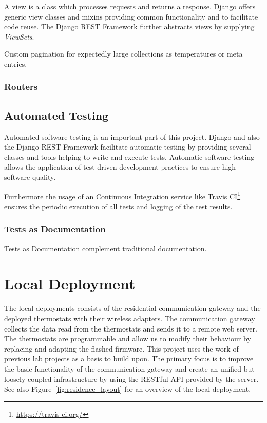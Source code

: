 A view is a class which processes requests and returns a response.
Django offers generic view classes and mixins providing common functionality and to facilitate code reuse.
The Django REST Framework further abstracts views by supplying \emph{ViewSets}.

Custom pagination for expectedly large collections as temperatures or meta entries.

\subsubsection{Routers}
\label{sec:server_infrastructure_routers}



\subsection{Automated Testing}

Automated software testing is an important part of this project. Django and also the Django REST Framework facilitate automatic testing by providing several classes and tools helping to write and execute tests. Automatic software testing allows the application of test-driven development practices to ensure high software quality.

Furthermore the usage of an Continuous Integration service like Travis CI\footnote{\url{https://travis-ci.org/}} ensures the periodic execution of all tests and logging of the test results.

\subsubsection{Tests as Documentation}

Tests as Documentation complement traditional documentation.


\section{Local Deployment}
\label{sec:local_infrastructure}

The local deployments consists of the residential communication gateway and the deployed thermostats with their wireless adapters. The communication gateway collects the data read from the thermostats and sends it to a remote web server. The thermostats are programmable and allow us to modify their behaviour by replacing and adapting the flashed firmware. This project uses the work of previous lab projects as a basis to build upon. The primary focus is to improve the basic functionality of the communication gateway and create an unified but loosely coupled infrastructure by using the RESTful API provided by the server.
See also Figure~\ref{fig:residence_layout} for an overview of the local deployment.

